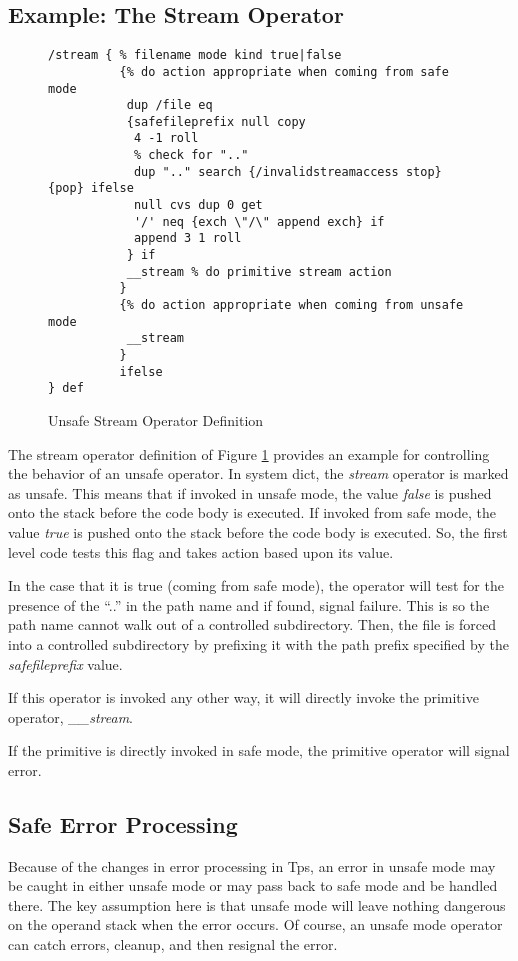 \subsection{Example: The Stream Operator}
\label{unsafestream}
\begin{figure}[tp]\centering
\begin{verbatim}
/stream { % filename mode kind true|false
          {% do action appropriate when coming from safe mode
           dup /file eq
           {safefileprefix null copy
            4 -1 roll
            % check for ".."
            dup ".." search {/invalidstreamaccess stop} {pop} ifelse
            null cvs dup 0 get
            '/' neq {exch \"/\" append exch} if
            append 3 1 roll
           } if
           __stream % do primitive stream action
          }
          {% do action appropriate when coming from unsafe mode
           __stream
          }
          ifelse
} def
\end{verbatim}
\caption{Unsafe Stream Operator Definition}
\label{unsstrmop}
\end{figure}
The stream operator definition of Figure \ref{unsstrmop}
provides an example for controlling the behavior of
an unsafe operator.
In system dict, the {\em stream} operator is marked as unsafe.
This means that if invoked in unsafe mode, the value {\em false}
is pushed onto the stack before the code body is executed.
If invoked from safe mode, the value {\em true}
is pushed onto the stack before the code body is executed.
So, the first level code tests this flag and takes action
based upon its value.

In the case that it is true (coming from safe mode),
the operator will test for the presence of the ``..'' in the
path name and if found, signal failure.  This is so the path name
cannot walk out of a controlled subdirectory.
Then, the file is forced into a controlled subdirectory by
prefixing it with the path prefix specified by the {\em safefileprefix}
value.

If this operator is invoked any other way, it will directly
invoke the primitive operator, {\em \_\_stream}.

If the primitive is directly invoked in safe mode, the primitive
operator will signal error.

\subsection{Safe Error Processing}
Because of the changes in error processing in Tps,
an error in unsafe mode may be caught in either
unsafe mode or may pass back to safe mode and be handled there.
The key assumption here is that unsafe mode will leave
nothing dangerous on the operand stack when the error occurs.
Of course, an unsafe mode operator can catch errors, cleanup,
and then resignal the error.

